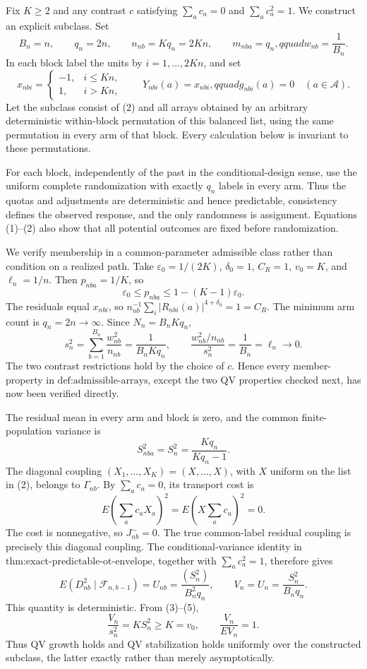 Fix \(K\ge2\) and any contrast \(c\) satisfying \(\sum_ac_a=0\) and \(\sum_ac_a^2=1\). We construct an explicit subclass. Set
\[
 B_n=n,\qquad q_n=2n,\qquad n_{nb}=Kq_n=2Kn,
 \qquad m_{nba}=q_n,qquad w_{nb}=\frac1{B_n}.
 \tag{1}
\]
In each block label the units by \(i=1,\ldots,2Kn\), and set
\[
 x_{nbi}=\begin{cases}-1,&i\le Kn,\\1,&i>Kn,\end{cases}
 \qquad Y_{nbi}(a)=x_{nbi},qquad g_{nbi}(a)=0
 \quad(a\in\mathcal A). \tag{2}
\]
Let the subclass consist of (2) and all arrays obtained by an arbitrary deterministic within-block permutation of this balanced list, using the same permutation in every arm of that block. Every calculation below is invariant to these permutations.

For each block, independently of the past in the conditional-design sense, use the uniform complete randomization with exactly \(q_n\) labels in every arm. Thus the quotas and adjustments are deterministic and hence predictable, consistency defines the observed response, and the only randomness is assignment. Equations (1)--(2) also show that all potential outcomes are fixed before randomization.

We verify membership in a common-parameter admissible class rather than condition on a realized path. Take \(\varepsilon_0=1/(2K)\), \(\delta_0=1\), \(C_R=1\), \(v_0=K\), and \(\ell_n=1/n\). Then \(p_{nba}=1/K\), so
\[
 \varepsilon_0\le p_{nba}\le1-(K-1)\varepsilon_0.
\]
The residuals equal \(x_{nbi}\), so \(n_{nb}^{-1}\sum_i|R_{nbi}(a)|^{4+\delta_0}=1=C_R\). The minimum arm count is \(q_n=2n\to\infty\). Since \(N_n=B_nKq_n\),
\[
 s_n^2=\sum_{b=1}^{B_n}\frac{w_{nb}^2}{n_{nb}}
 =\frac1{B_nKq_n},
 \qquad
 \frac{w_{nb}^2/n_{nb}}{s_n^2}=\frac1{B_n}=\ell_n\longrightarrow0. \tag{3}
\]
The two contrast restrictions hold by the choice of \(c\). Hence every member-property in \(\text{def:admissible-arrays}\), except the two QV properties checked next, has now been verified directly.

The residual mean in every arm and block is zero, and the common finite-population variance is
\[
 S_{nba}^2=S_n^2=\frac{Kq_n}{Kq_n-1}. \tag{4}
\]
The diagonal coupling \((X_1,\ldots,X_K)=(X,\ldots,X)\), with \(X\) uniform on the list in (2), belongs to \(\Gamma_{nb}\). By \(\sum_ac_a=0\), its transport cost is
\[
 E\left(\sum_ac_aX_a\right)^2
 =E\left(X\sum_ac_a\right)^2=0.
\]
The cost is nonnegative, so \(J_{nb}^{-}=0\). The true common-label residual coupling is precisely this diagonal coupling. The conditional-variance identity in \(\text{thm:exact-predictable-ot-envelope}\), together with \(\sum_ac_a^2=1\), therefore gives
\[
 E(D_{nb}^2\mid\mathcal F_{n,b-1})
 =U_{nb}=\frac{(S_n^2)}{B_n^2q_n},
 \qquad
 V_n=U_n=\frac{S_n^2}{B_nq_n}. \tag{5}
\]
This quantity is deterministic. From (3)--(5),
\[
 \frac{V_n}{s_n^2}=KS_n^2\ge K=v_0,
 \qquad
 \frac{V_n}{EV_n}=1. \tag{6}
\]
Thus QV growth holds and QV stabilization holds uniformly over the constructed subclass, the latter exactly rather than merely asymptotically.

